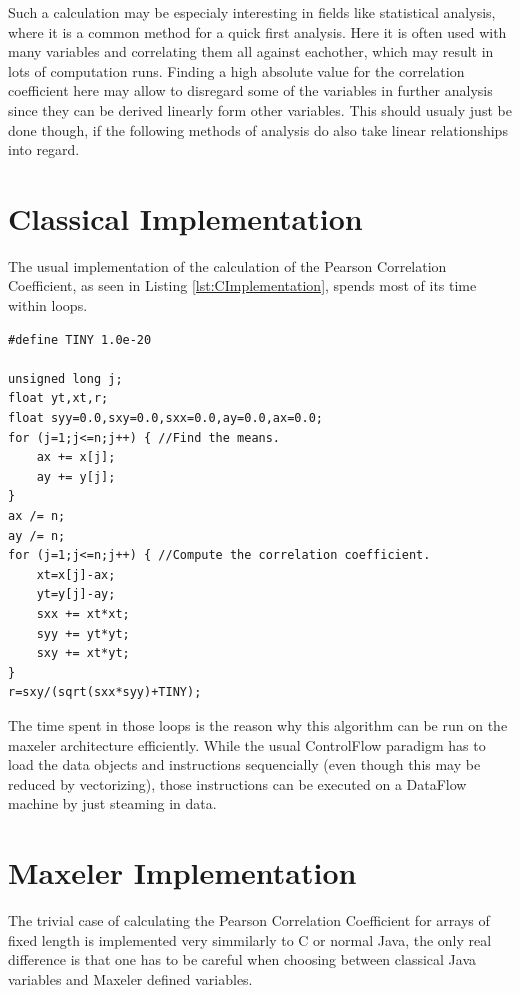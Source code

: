 \documentclass{llncs}
\begin{document}
Such a calculation may be especialy interesting in fields like statistical analysis, where it is a common method for a quick first analysis. Here it is often used with many variables and correlating them all against eachother, which may result in lots of computation runs. Finding a high absolute value for the correlation coefficient here may allow to disregard some of the variables in further analysis since they can be derived linearly form other variables. This should usualy just be done though, if the following methods of analysis do also take linear relationships into regard.

\section{Classical Implementation}\label{sec:Classical_Implementation}

The usual implementation of the calculation of the Pearson Correlation Coefficient, as seen in Listing \ref{lst:CImplementation}, spends most of its time within loops.

\begin{lstlisting}[style=CStyle,label={lst:CImplementation},caption={Implementation in C, modified from \cite{Press:1988:NRC:42249}},captionpos=b]
#define TINY 1.0e-20

unsigned long j;
float yt,xt,r;
float syy=0.0,sxy=0.0,sxx=0.0,ay=0.0,ax=0.0;
for (j=1;j<=n;j++) { //Find the means.
	ax += x[j];
	ay += y[j];
}
ax /= n;
ay /= n;
for (j=1;j<=n;j++) { //Compute the correlation coefficient.
	xt=x[j]-ax;
	yt=y[j]-ay;
	sxx += xt*xt;
	syy += yt*yt;
	sxy += xt*yt;
}
r=sxy/(sqrt(sxx*syy)+TINY); 
\end{lstlisting}

The time spent in those loops is the reason why this algorithm can be run on the maxeler architecture efficiently. While the usual ControlFlow paradigm has to load the data objects and instructions sequencially (even though this may be reduced by vectorizing), those instructions can be executed on a DataFlow machine by just steaming in data.

\section{Maxeler Implementation}\label{sec:Maxeler_Implementation}

The trivial case of calculating the Pearson Correlation Coefficient for arrays of fixed length is implemented very simmilarly to C or normal Java, the only real difference is that one has to be careful when choosing between classical Java variables and Maxeler defined variables.
\end{document}
